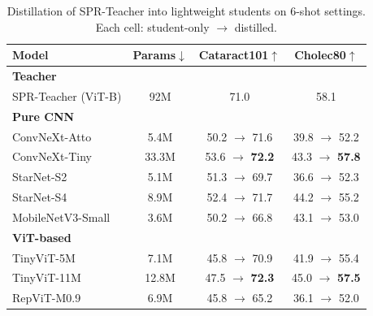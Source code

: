 \begin{table}[b]
\centering
\caption{Distillation of SPR-Teacher into lightweight students on 6-shot settings.
Each cell: student-only $\rightarrow$ distilled.}
\label{tab:distill_models}
\small
\setlength{\tabcolsep}{4pt}
\begin{tabular}{l c c c}
\toprule
Model & Params$\downarrow$ & Cataract101$\uparrow$ & Cholec80$\uparrow$ \\
\midrule
\multicolumn{4}{l}{\textbf{Teacher}} \\
\quad SPR-Teacher (ViT-B)            & 92M  & 71.0            & 58.1 \\
\midrule
\multicolumn{4}{l}{\textbf{Pure CNN}} \\
\quad ConvNeXt-Atto               & 5.4M & 50.2 $\rightarrow$ 71.6 & 39.8 $\rightarrow$ 52.2 \\
\quad ConvNeXt-Tiny               & 33.3M & 53.6 $\rightarrow$ \textbf{72.2}          & 43.3 $\rightarrow$ \textbf{57.8} \\
\quad StarNet-S2                  & 5.1M & 51.3 $\rightarrow$ 69.7          & 36.6 $\rightarrow$ 52.3 \\
\quad StarNet-S4                  & 8.9M & 52.4 $\rightarrow$ 71.7          & 44.2 $\rightarrow$ 55.2 \\
\quad MobileNetV3-Small           & 3.6M & 50.2 $\rightarrow$ 66.8          & 43.1 $\rightarrow$ 53.0 \\
\midrule
\multicolumn{4}{l}{\textbf{ViT-based}} \\
\quad TinyViT-5M                  & 7.1M & 45.8 $\rightarrow$ 70.9          & 41.9 $\rightarrow$ 55.4 \\
\quad TinyViT-11M                 & 12.8M & 47.5 $\rightarrow$ \textbf{72.3}          & 45.0 $\rightarrow$ \textbf{57.5} \\
\quad RepViT-M0.9                 & 6.9M & 45.8 $\rightarrow$ 65.2          & 36.1 $\rightarrow$ 52.0 \\

\end{tabular}
\end{table}
